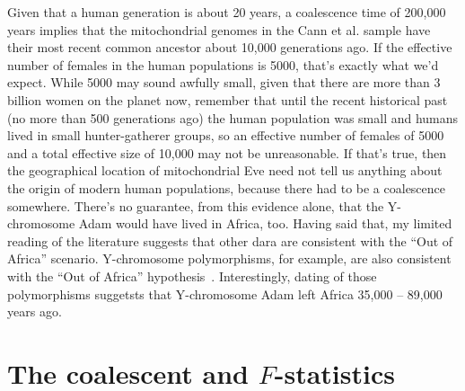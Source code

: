 \documentclass[12pt]{article}
\begin{document}
Given that a human generation is about 20 years, a coalescence time of
200,000 years implies that the mitochondrial genomes in the Cann et
al. sample have their most recent common ancestor about 10,000
generations ago. If the effective number of females in the human
populations is 5000, that's exactly what we'd expect. While 5000 may
sound awfully small, given that there are more than 3 billion women on
the planet now, remember that until the recent historical past (no
more than 500 generations ago) the human population was small and
humans lived in small hunter-gatherer groups, so an effective number
of females of 5000 and a total effective size of 10,000 may not be
unreasonable. If that's true, then the geographical location of
mitochondrial Eve need not tell us anything about the origin of modern
human populations, because there had to be a coalescence
somewhere. There's no guarantee, from this evidence alone, that the
Y-chromosome Adam would have lived in Africa, too. Having said that,
my limited reading of the literature suggests that other dara are
consistent with the ``Out of Africa'' scenario. Y-chromosome
polymorphisms, for example, are also consistent with the ``Out of
Africa'' hypothesis~\cite{Underhill-etal-2000}. Interestingly, dating
of those polymorphisms suggetsts that Y-chromosome Adam left Africa
35,000 -- 89,000 years ago.

\section*{The coalescent and $F$-statistics}
\end{document}

